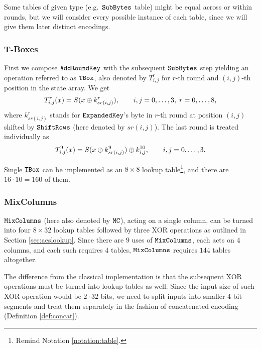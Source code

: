 \begin{note}
\label{note:tableinst}
	Some tables of given type (e.g.\ $\texttt{SubBytes}$ table) might be equal across or within rounds, but we will consider every possible instance of each table, since we will give them later distinct encodings.
\end{note}

\subsubsection{T-Boxes}
	
	First we compose $\texttt{AddRoundKey}$ with the subsequent $\texttt{SubBytes}$ step yielding an operation referred to as $\texttt{TBox}$, also denoted by $T_{i,j}^r$ for $r$-th round and $(i,j)$-th position in the state array. We get
	\begin{equation}
		T_{i,j}^r(x) = S(x\oplus k_{sr(i,j)}^r) , \qquad i,j=0 , \ldots , 3,\;r=0 , \ldots , 8 ,
	\end{equation}
	where $k_{sr(i,j)}^r$ stands for $\texttt{ExpandedKey}$'s byte in $r$-th round at position $(i,j)$ shifted by $\texttt{ShiftRows}$ (here denoted by $sr(i,j)$). The last round is treated individually as
	\begin{equation}
	\label{eq:lasttbox}
		T_{i,j}^{9}(x) = S(x\oplus k_{sr(i,j)}^9) \oplus k_{i,j}^{10} , \qquad i,j=0 , \ldots , 3 .
	\end{equation}
	
	Single $\texttt{TBox}$ can be implemented as an $8\times 8$ lookup table\footnote{Remind Notation \ref{notation:table}.}, and there are $16\cdot 10 = 160$ of them.

\subsubsection{MixColumns}
	
	$\texttt{MixColumns}$ (here also denoted by $\texttt{MC}$), acting on a single column, can be turned into four $8\times 32$ lookup tables followed by three XOR operations as outlined in Section \ref{sec:aeslookup}. Since there are $9$ uses of $\texttt{MixColumns}$, each acts on $4$ columns, and each such requires $4$ tables, $\texttt{MixColumns}$ requires $144$ tables altogether.
	
	The difference from the classical implementation is that the subsequent XOR operations must be turned into lookup tables as well. Since the input size of such XOR operation would be $2\cdot 32$ bits, we need to split inputs into smaller $4$-bit segments and treat them separately in the fashion of concatenated encoding (Definition \ref{def:concat}).
	
